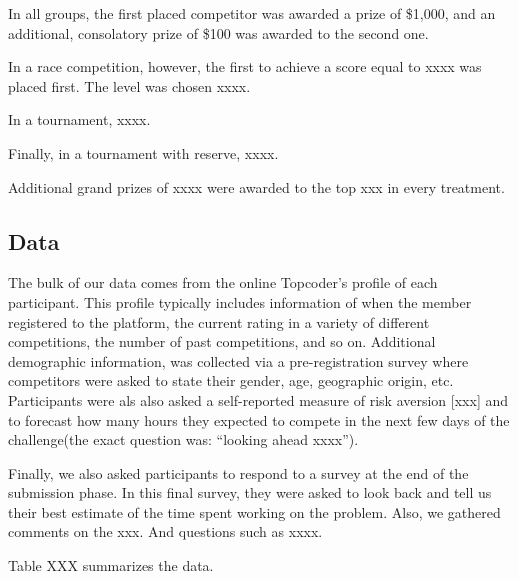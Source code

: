 \documentclass[12pt,]{article}
\begin{document}
In all groups, the first placed competitor was awarded a prize of
\$1,000, and an additional, consolatory prize of \$100 was awarded to
the second one.

In a race competition, however, the first to achieve a score equal to
xxxx was placed first. The level was chosen xxxx.

In a tournament, xxxx.

Finally, in a tournament with reserve, xxxx.

Additional grand prizes of xxxx were awarded to the top xxx in every
treatment.

\subsection{Data}\label{data}

The bulk of our data comes from the online Topcoder's profile of each
participant. This profile typically includes information of when the
member registered to the platform, the current rating in a variety of
different competitions, the number of past competitions, and so on.
Additional demographic information, was collected via a pre-registration
survey where competitors were asked to state their gender, age,
geographic origin, etc. Participants were als also asked a self-reported
measure of risk aversion {[}xxx{]} and to forecast how many hours they
expected to compete in the next few days of the challenge(the exact
question was: ``looking ahead xxxx'').

Finally, we also asked participants to respond to a survey at the end of
the submission phase. In this final survey, they were asked to look back
and tell us their best estimate of the time spent working on the
problem. Also, we gathered comments on the xxx. And questions such as
xxxx.

Table XXX summarizes the data.
\end{document}
